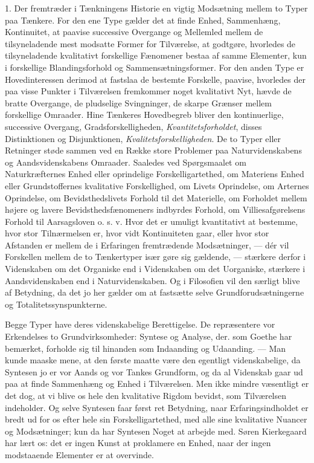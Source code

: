 \documentclass[12pt,a4paper,openany]{book}
\newcommand{\opage}[1]{\marginnote{\footnotesize\textit{[#1]}}}
\begin{document}
1. Der fremtræder i Tænkningens Historie en vigtig
Modsætning mellem to Typer paa Tænkere. For den
ene Type gælder det at finde Enhed, Sammenhæng, Kontinuitet,
at paavise successive Overgange og Mellemled
mellem de tilsyneladende mest modsatte Former for Tilværelse,
at godtgøre, hvorledes de tilsyneladende kvalitativt
forskellige Fænomener bestaa af samme Elementer,
kun i forskellige Blandingsforhold og Sammensætningsformer.
For den anden Type er Hovedinteressen derimod
at fastslaa de bestemte Forskelle, paavise, hvorledes
der paa visse Punkter i Tilværelsen fremkommer noget
kvalitativt Nyt, hævde de bratte Overgange, de pludselige
Svingninger, de skarpe Grænser mellem forskellige
Omraader. Hine Tænkeres Hovedbegreb bliver den kontinuerlige,
successive Overgang, Gradsforskelligheden,
\textit{Kvantitetsforholdet}, disses Distinktionen og Disjunktionen,
\textit{Kvalitetsforskelligheden}. De to Typer eller
Retninger støde sammen ved en Række store Problemer
paa Naturvidenskabens og Aandsvidenskabens Omraader.
\opage{71}Saaledes ved Spørgsmaalet om Naturkræfternes Enhed
eller oprindelige Forskelligartethed, om Materiens Enhed
eller Grundstoffernes kvalitative Forskellighed, om
Livets Oprindelse, om Arternes Oprindelse, om Bevidsthedslivets
Forhold til det Materielle, om Forholdet mellem
højere og lavere Bevidsthedsfænomeners indbyrdes
Forhold, om Villiesafgørelsens Forhold til Aarsagsloven
o. s. v. Hvor det er umuligt kvantitativt at bestemme,
hvor stor Tilnærmelsen er, hvor vidt Kontinuiteten gaar,
eller hvor stor Afstanden er mellem de i Erfaringen
fremtrædende Modsætninger, --- dér vil Forskellen mellem
de to Tænkertyper især gøre sig gældende, --- stærkere
derfor i Videnskaben om det Organiske end i
Videnskaben om det Uorganiske, stærkere i Aandsvidenskaben
end i Naturvidenskaben. Og i Filosofien vil den
særligt blive af Betydning, da det jo her gælder om at
fastsætte selve Grundforudsætningerne og Totalitetssynspunkterne.

Begge Typer have deres videnskabelige Berettigelse.
De repræsentere vor Erkendelses to Grundvirksomheder:
Syntese og Analyse, der. som Goethe har bemærket, forholde
sig til hinanden som Indaanding og Udaanding. ---
Man kunde maaske mene, at den første maatte være den
egentligt videnskabelige, da Syntesen jo er vor Aands
og vor Tankes Grundform, og da al Videnskab gaar
ud paa at finde Sammenhæng og Enhed i Tilværelsen.
Men ikke mindre væsentligt er det dog, at vi blive os
hele den kvalitative Rigdom bevidst, som Tilværelsen
indeholder. Og selve Syntesen faar først ret Betydning,
naar Erfaringsindholdet er bredt ud for os efter hele sin
Forskelligartethed, med alle sine kvalitative Nuancer og
Modsætninger; kun da har Syntesen Noget at arbejde
med. Søren Kierkegaard har lært os: det er ingen
\opage{72}Kunst at proklamere en Enhed, naar der ingen modstaaende
Elementer er at overvinde.
\end{document}
